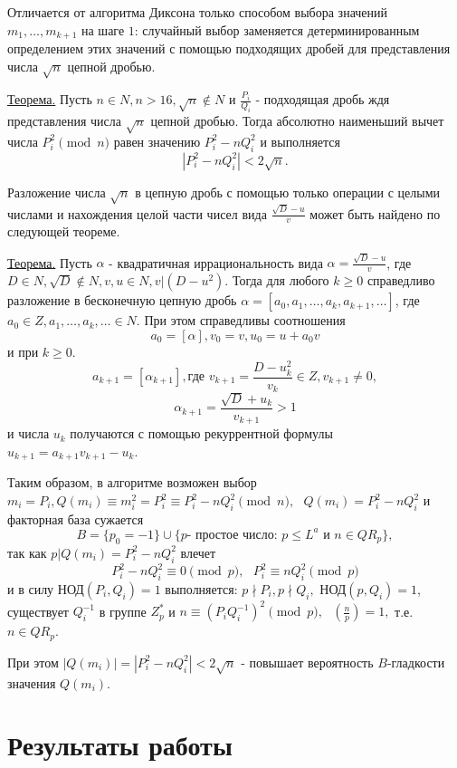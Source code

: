 \documentclass[bachelor, och, labwork]{shiza}
\begin{document}
    Отличается от алгоритма Диксона только способом выбора значений\\ $m_1,
    \dots, m_{k+1}$ на шаге $1$: случайный выбор заменяется детерминированным
    определением этих значений с помощью подходящих дробей для представления
    числа $\sqrt{n}$ цепной дробью.

    \underline{Теорема.} Пусть $n \in N, n > 16, \sqrt{n} \notin N$ и
    $\frac{P_i}{Q_i}$ - подходящая дробь ждя представления числа $\sqrt{n}$
    цепной дробью. Тогда абсолютно наименьший вычет числа $P_i^2 \pmod n$ равен
    значению $P_i^2 - nQ_i^2$ и выполняется $$|P_i^2 - nQ_i^2| < 2\sqrt{n}.$$
    
    Разложение числа $\sqrt{n}$ в цепную дробь с помощью только операции с
    целыми числами и нахождения целой части чисел вида $\frac{\sqrt{D} - u}{v}$
    может быть найдено по следующей теореме.

    \underline{Теорема.} Пусть $\alpha$ - квадратичная иррациональность вида
    $\alpha = \frac{\sqrt{D} - u}{v}$, где $D \in N, \sqrt{D} \notin N, v, u \in
    N, v | (D - u^2)$. Тогда для любого $k \geq 0$ справедливо разложение в
    бесконечную цепную дробь $\alpha = [a_0, a_1, \dots, a_k, a_{k+1}, \dots]$,
    где $a_0 \in Z, a_1, \dots, a_k, \dots \in N$. При этом справедливы
    соотношения $$a_0 = [\alpha], v_0 = v, u_0 = u + a_0 v$$ и при $k \geq 0.$
    $$a_{k+1} = [\alpha_{k + 1}], \text{где } v_{k + 1} = \frac{D - u^2_k}{v_k}
    \in Z, v_{k + 1} \neq 0,$$ $$\alpha_{k + 1} = \frac{\sqrt{D} + u_k}{v_{k +
    1}} > 1$$ и числа $u_k$ получаются с помощью рекуррентной формулы $u_{k + 1}
    = a_{k + 1} v_{k + 1} - u_k.$

    Таким образом, в алгоритме возможен выбор $m_i = P_i, Q(m_i) \equiv m^2_i =
    P^2_i \equiv P^2_i - nQ^2_i \pmod n, \text{ } Q(m_i) = P^2_i - nQ^2_i$ и
    факторная база сужается $$B = \{p_0 = -1 \} \cup \{p \text{- простое число:
    } p \leq L^a \text{ и } n \in QR_p\},$$ так как $p | Q(m_i) = P^2_i -
    nQ^2_i$ влечет $$P^2_i - nQ^2_i \equiv 0 \pmod p, \text{ } P^2_i \equiv
    nQ^2_i \pmod p$$ и в силу НОД$(P_i, Q_i) = 1$ выполняется: $p \nmid P_i, p
    \nmid Q_i,$ НОД$(p, Q_i) = 1$, существует $Q_i^{-1}$ в группе $Z_p^*$ и $n
    \equiv (P_i Q_i^{-1})^2 \pmod p, \text{ } \left(\frac{n}{p}\right) = 1,$
    т.е. $n \in QR_p.$

    При этом $|Q(m_i)| = |P^2_i - nQ^2_i| < 2\sqrt{n}$ - повышает вероятность
    $B$-гладкости значения $Q(m_i)$.


\section{Результаты работы}
\end{document}
